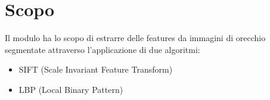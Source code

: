 \chapter{Scopo}
Il modulo ha lo scopo di estrarre delle features da immagini di orecchio segmentate attraverso l'applicazione di due algoritmi:
\begin{itemize}
	\item SIFT (Scale Invariant Feature Transform)
	\item LBP (Local Binary Pattern)
\end{itemize}